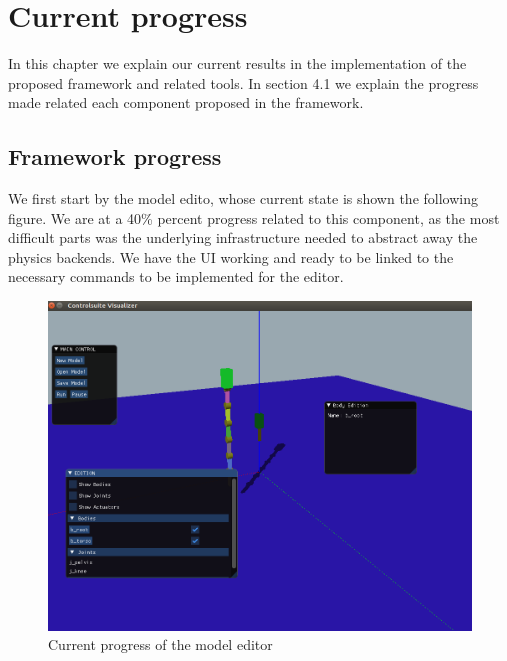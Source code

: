 
\chapter{Current progress}
\label{ch:current_progress}

In this chapter we explain our current results in the implementation of the proposed framework and
related tools. In section 4.1 we explain the progress made related each component proposed in the
framework.

\section{Framework progress}

We first start by the model edito, whose current state is shown the following figure. We are
at a 40\% percent progress related to this component, as the most difficult parts was the underlying
infrastructure needed to abstract away the physics backends. We have the UI working and ready to be
linked to the necessary commands to be implemented for the editor.

\begin{figure}
    \centering
    \includegraphics[width=6in]{./chapters/imgs/img_current_progress_model_editor.png}
    \caption[img_cp_model_editor]{Current progress of the model editor}
    \label{fig:img_cp_model_editor}
\end{figure}

